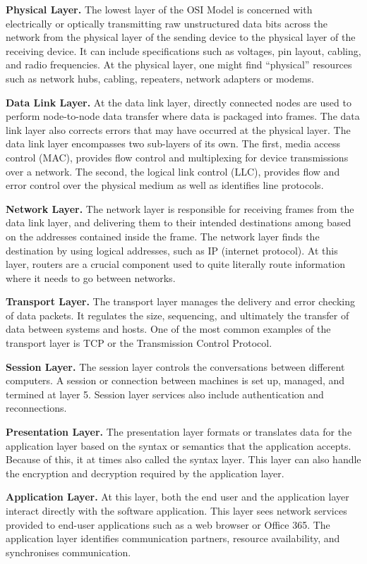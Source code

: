 \documentclass[../report.tex]{subfiles}
\begin{document}
\textbf{Physical Layer.} The lowest layer of the OSI Model is concerned with electrically or optically transmitting raw unstructured data bits across the network from the physical layer of the sending device to the physical layer of the receiving device. It can include specifications such as voltages, pin layout, cabling, and radio frequencies. At the physical layer, one might find “physical” resources such as network hubs, cabling, repeaters, network adapters or modems.

\textbf{Data Link Layer.} At the data link layer, directly connected nodes are used to perform node-to-node data transfer where data is packaged into frames. The data link layer also corrects errors that may have occurred at the physical layer. The data link layer encompasses two sub-layers of its own. The first, media access control (MAC), provides flow control and multiplexing for device transmissions over a network. The second, the logical link control (LLC), provides flow and error control over the physical medium as well as identifies line protocols.

\textbf{Network Layer.} The network layer is responsible for receiving frames from the data link layer, and delivering them to their intended destinations among based on the addresses contained inside the frame. The network layer finds the destination by using logical addresses, such as IP (internet protocol). At this layer, routers are a crucial component used to quite literally route information where it needs to go between networks.

\textbf{Transport Layer.} The transport layer manages the delivery and error checking of data packets. It regulates the size, sequencing, and ultimately the transfer of data between systems and hosts. One of the most common examples of the transport layer is TCP or the Transmission Control Protocol.

\textbf{Session Layer.} The session layer controls the conversations between different computers. A session or connection between machines is set up, managed, and termined at layer 5. Session layer services also include authentication and reconnections.

\textbf{Presentation Layer.} The presentation layer formats or translates data for the application layer based on the syntax or semantics that the application accepts. Because of this, it at times also called the syntax layer. This layer can also handle the encryption and decryption required by the application layer.

\textbf{Application Layer.} At this layer, both the end user and the application layer interact directly with the software application. This layer sees network services provided to end-user applications such as a web browser or Office 365. The application layer identifies communication partners, resource availability, and synchronises communication.
\end{document}
